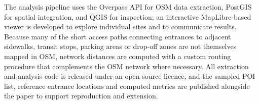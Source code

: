 \documentclass{article}
\begin{document}
The analysis pipeline uses the Overpass API for OSM data extraction,
PostGIS for spatial integration, and QGIS for inspection; an
interactive MapLibre-based viewer is developed to explore individual
sites and to communicate results. Because many of the short access
paths connecting entrances to adjacent sidewalks, transit stops,
parking areas or drop-off zones are not themselves mapped in OSM,
network distances are computed with a custom routing procedure that
complements the OSM network where necessary. All extraction and
analysis code is released under an open-source licence, and the
sampled POI list, reference entrance locations and computed metrics
are published alongside the paper to support reproduction and
extension.
\end{document}
